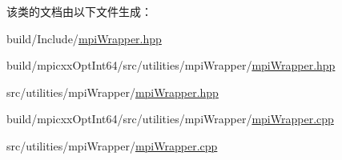 该类的文档由以下文件生成：\begin{DoxyCompactItemize}
\item 
build/Include/\hyperlink{build_2Include_2mpiWrapper_8hpp}{mpiWrapper.hpp}\item 
build/mpicxxOptInt64/src/utilities/mpiWrapper/\hyperlink{build_2mpicxxOptInt64_2src_2utilities_2mpiWrapper_2mpiWrapper_8hpp}{mpiWrapper.hpp}\item 
src/utilities/mpiWrapper/\hyperlink{src_2utilities_2mpiWrapper_2mpiWrapper_8hpp}{mpiWrapper.hpp}\item 
build/mpicxxOptInt64/src/utilities/mpiWrapper/\hyperlink{build_2mpicxxOptInt64_2src_2utilities_2mpiWrapper_2mpiWrapper_8cpp}{mpiWrapper.cpp}\item 
src/utilities/mpiWrapper/\hyperlink{src_2utilities_2mpiWrapper_2mpiWrapper_8cpp}{mpiWrapper.cpp}\end{DoxyCompactItemize}
